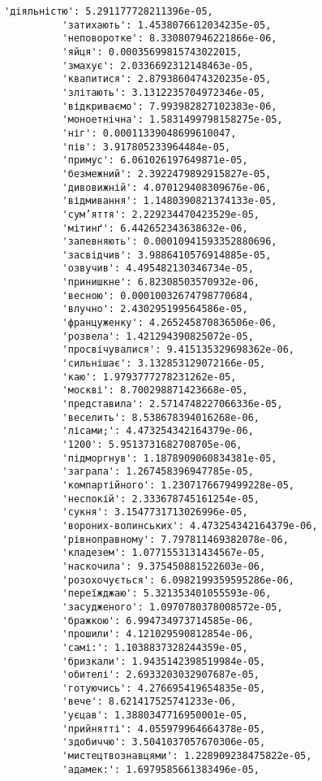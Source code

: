 \documentclass[11pt]{article}
\begin{document}
\begin{Verbatim}[commandchars=\\\{\}]
          'діяльністю': 5.291177728211396e-05,
          'затихають': 1.4538076612034235e-05,
          'неповоротке': 8.330807946221866e-06,
          'яйця': 0.00035699815743022015,
          'змахує': 2.0336692312148463e-05,
          'квапитися': 2.8793860474320235e-05,
          'злітають': 3.1312235704972346e-05,
          'відкриваємо': 7.993982827102383e-06,
          'моноетнічна': 1.5831499798158275e-05,
          'ніг': 0.00011339048699610047,
          'пів': 3.917805233964484e-05,
          'примус': 6.061026197649871e-05,
          'безмежний': 2.3922479892915827e-05,
          'дивовижній': 4.070129408309676e-06,
          'відмивання': 1.1480390821374133e-05,
          'сум’яття': 2.229234470423529e-05,
          'мітинґ': 6.442652343638632e-06,
          'запевняють': 0.00010941593352880696,
          'засвідчив': 3.9886410576914885e-05,
          'озвучив': 4.495482130346734e-05,
          'принишкне': 6.82308503570932e-06,
          'весною': 0.00010032674798770684,
          'влучно': 2.430295199564586e-05,
          'француженку': 4.265245870836506e-06,
          'розвела': 1.421294390825072e-05,
          'просвічувалися': 9.415135329698362e-06,
          'сильнішає': 3.132853129072166e-05,
          'каю': 1.9793777278231262e-05,
          'москві': 8.700298871423668e-05,
          'представила': 2.5714748227066336e-05,
          'веселить': 8.538678394016268e-06,
          'лісами;': 4.473254342164379e-06,
          '1200': 5.9513731682708705e-06,
          'підморгнув': 1.1878909060834381e-05,
          'заграла': 1.267458396947785e-05,
          'компартійного': 1.2307176679499228e-05,
          'неспокій': 2.333678745161254e-05,
          'сукня': 3.1547731713026996e-05,
          'вороних-волинських': 4.473254342164379e-06,
          'рівноправному': 7.797811469382078e-06,
          'кладезем': 1.0771553131434567e-05,
          'наскочила': 9.375450881522603e-06,
          'розохочується': 6.0982199359595286e-06,
          'переїжджаю': 5.321353401055593e-06,
          'засудженого': 1.0970780378008572e-05,
          'бражкою': 6.994734973714585e-06,
          'прошили': 4.121029590812854e-06,
          'самі:': 1.1038837328244359e-05,
          'бризкали': 1.9435142398519984e-05,
          'обителі': 2.6933203032907687e-05,
          'готуючись': 4.276695419654835e-05,
          'вече': 8.621417525741233e-06,
          'уєцав': 1.3880347716950001e-05,
          'прийнятті': 4.055979964664378e-05,
          'здобиччю': 3.5041037057670306e-05,
          'мистецтвознавцями': 1.228909238475822e-05,
          'адамек:': 1.6979585661383496e-05,

\end{Verbatim}
\end{document}
